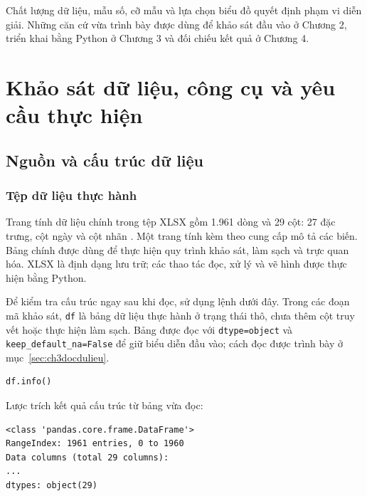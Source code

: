 \documentclass[12pt,a4paper,oneside]{report}
\newcommand{\tenCot}[1]{\texttt{\detokenize{#1}}}
\newcommand{\maCot}[1]{{\urlstyle{tt}\def\UrlBreaks{\do\_\do\/\do\.}\def\UrlBigBreaks{}\nolinkurl{#1}}}
\begin{document}
Chất lượng dữ liệu, mẫu số, cỡ mẫu và lựa chọn biểu đồ quyết định phạm vi diễn giải. Những căn cứ vừa trình bày được dùng để khảo sát đầu vào ở Chương 2, triển khai bằng Python ở Chương 3 và đối chiếu kết quả ở Chương 4.

\chapter{Khảo sát dữ liệu, công cụ và yêu cầu thực hiện}
\label{chap:khaosatdulieu}

\section{Nguồn và cấu trúc dữ liệu}
\label{sec:nguondulieu}

\subsection{Tệp dữ liệu thực hành}

Trang tính dữ liệu chính trong tệp XLSX gồm 1.961 dòng và 29 cột: 27 đặc trưng, cột ngày \tenCot{Production_Date} và cột nhãn \tenCot{Faults}. Một trang tính kèm theo cung cấp mô tả các biến. Bảng chính được dùng để thực hiện quy trình khảo sát, làm sạch và trực quan hóa. XLSX là định dạng lưu trữ; các thao tác đọc, xử lý và vẽ hình được thực hiện bằng Python.

Để kiểm tra cấu trúc ngay sau khi đọc, sử dụng lệnh dưới đây. Trong các đoạn mã khảo sát, \maCot{df} là bảng dữ liệu thực hành ở trạng thái thô, chưa thêm cột truy vết hoặc thực hiện làm sạch. Bảng được đọc với \maCot{dtype=object} và \maCot{keep_default_na=False} để giữ biểu diễn đầu vào; cách đọc được trình bày ở mục~\ref{sec:ch3docdulieu}.

\noindent\begin{minipage}{\linewidth}
\begin{lstlisting}[language=Python]
df.info()
\end{lstlisting}
\end{minipage}\par

Lược trích kết quả cấu trúc từ bảng vừa đọc:

\noindent\begin{minipage}{\linewidth}
\begin{lstlisting}[language={}]
<class 'pandas.core.frame.DataFrame'>
RangeIndex: 1961 entries, 0 to 1960
Data columns (total 29 columns):
...
dtypes: object(29)
\end{lstlisting}
\end{minipage}\par
\end{document}

